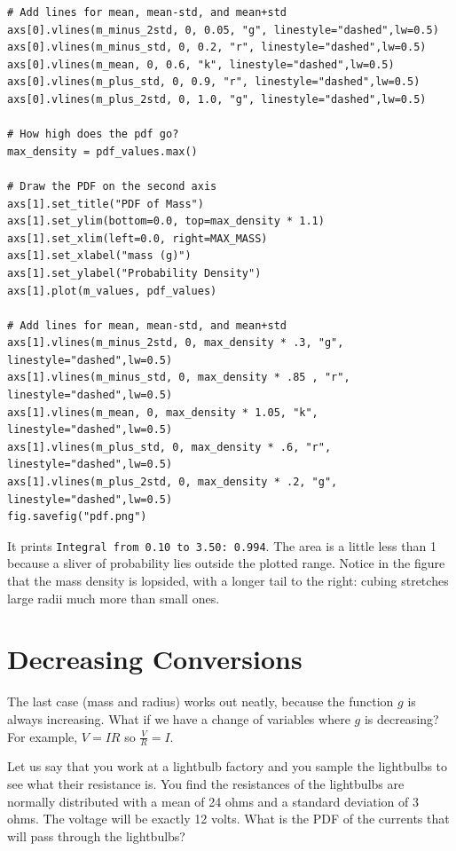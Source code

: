 \begin{verbatim}
# Add lines for mean, mean-std, and mean+std
axs[0].vlines(m_minus_2std, 0, 0.05, "g", linestyle="dashed",lw=0.5)
axs[0].vlines(m_minus_std, 0, 0.2, "r", linestyle="dashed",lw=0.5)
axs[0].vlines(m_mean, 0, 0.6, "k", linestyle="dashed",lw=0.5)
axs[0].vlines(m_plus_std, 0, 0.9, "r", linestyle="dashed",lw=0.5)
axs[0].vlines(m_plus_2std, 0, 1.0, "g", linestyle="dashed",lw=0.5)

# How high does the pdf go?
max_density = pdf_values.max()

# Draw the PDF on the second axis
axs[1].set_title("PDF of Mass")
axs[1].set_ylim(bottom=0.0, top=max_density * 1.1)
axs[1].set_xlim(left=0.0, right=MAX_MASS)
axs[1].set_xlabel("mass (g)")
axs[1].set_ylabel("Probability Density")
axs[1].plot(m_values, pdf_values)

# Add lines for mean, mean-std, and mean+std
axs[1].vlines(m_minus_2std, 0, max_density * .3, "g", linestyle="dashed",lw=0.5)
axs[1].vlines(m_minus_std, 0, max_density * .85 , "r", linestyle="dashed",lw=0.5)
axs[1].vlines(m_mean, 0, max_density * 1.05, "k", linestyle="dashed",lw=0.5)
axs[1].vlines(m_plus_std, 0, max_density * .6, "r", linestyle="dashed",lw=0.5)
axs[1].vlines(m_plus_2std, 0, max_density * .2, "g", linestyle="dashed",lw=0.5)
fig.savefig("pdf.png")
\end{verbatim}

It prints \texttt{Integral from 0.10 to 3.50: 0.994}. The area is a little
less than 1 because a sliver of probability lies outside the plotted range.
Notice in the figure that the mass density is lopsided, with a longer tail to
the right: cubing stretches large radii much more than small ones.

\section{Decreasing Conversions}

The last case (mass and radius) works out neatly, because the function $g$ is always increasing. What if we have a change of variables where 
$g$ is decreasing? For example, $V= IR$ so $\frac{V}{R} = I$.

Let us say that you work at a lightbulb factory and you sample the lightbulbs to see what their resistance is. You find the resistances of the lightbulbs are normally distributed with a mean of 24 ohms and a standard deviation of 3 ohms. The voltage will be exactly 12 volts. What is the PDF of the currents that will pass through the lightbulbs?

